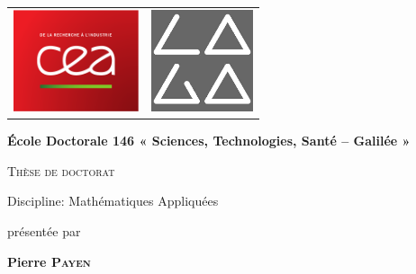 \hypersetup{pageanchor=false}
\begin{titlepage}
 
\begin{minipage}[t]{\textwidth}
\begin{center}
  \begin{tabularx}{\textwidth}{@{\extracolsep{\fill}}lr}
  \includegraphics[height = 3cm]{images/logo/CEA.pdf} &
  \includegraphics[height = 3cm]{images/logo/laga.jpg}
  \end{tabularx}
\end{center}
\end{minipage}

\begin{center}
{\Large \textbf{École Doctorale 146 « Sciences, Technologies, Santé – Galilée »}}


{\Huge \textsc{Thèse de doctorat}}


{\LARGE Discipline: Mathématiques Appliquées}


{\large présentée par}

{
    \textbf{{\LARGE Pierre \textsc{Payen}}}\\
}


\end{center}
\end{titlepage}
